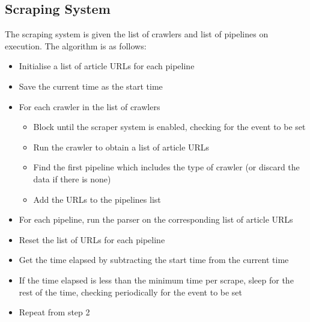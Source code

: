 \documentclass{l4proj}
\begin{document}
\subsection{Scraping System}
The scraping system is given the list of crawlers and list of pipelines on execution. The algorithm is as follows:
\begin{itemize}
    \item Initialise a list of article URLs for each pipeline
    \item Save the current time as the start time
    \item For each crawler in the list of crawlers
    \begin{itemize}
        \item Block until the scraper system is enabled, checking for the event to be set
        \item Run the crawler to obtain a list of article URLs
        \item Find the first pipeline which includes the type of crawler (or discard the data if there is none)
        \item Add the URLs to the pipelines list
    \end{itemize}
    \item For each pipeline, run the parser on the corresponding list of article URLs
    \item Reset the list of URLs for each pipeline
    \item Get the time elapsed by subtracting the start time from the current time
    \item If the time elapsed is less than the minimum time per scrape, sleep for the rest of the time, checking periodically for the event to be set
    \item Repeat from step 2
\end{itemize}
\end{document}
